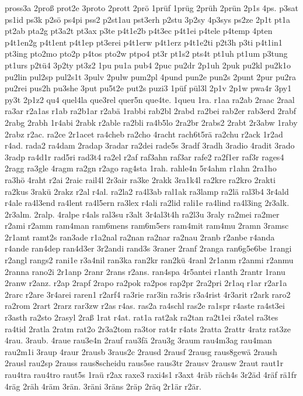{pross3a
2proß
prot2e
3proto
2prott
2prö
1prüf
1prüg
2prüh
2prün
2p1s
4ps.
p3sat
ps1id
ps3k
p2sö
ps4pi
pss2
p2st1au
pst3erh
p2stu
3p2sy
4p3sys
ps2ze
2p1t
pt1a
pt2ab
pta2g
pt3a2t
pt3ax
p3te
p4t1e2b
p4t3ec
p4t1ei
p4tele
p4temp
4pten
p4t1en2g
p4t1ent
p4t1ep
pt3erei
p4t1erw
p4t1erz
p4t1e2ti
p2t3h
p3ti
p4t1in1
pt3ing
pto2mo
pto2p
p4tos
pto2w
ptpo4
pt3r
pt1s2
pts4t
pt1uh
pt1um
p3tung
pt1urs
p2tü4
3p2ty
pt3z2
1pu
pu1a
pub4
2puc
pu2dr
2p1uh
2puk
pu2kl
pu2k1o
pu2lin
pul2sp
pul2s1t
3pulv
2pulw
pum2pl
4pund
pun2e
pun2s
2punt
2pur
pu2ra
pu2rei
pus2h
pu3she
3put
pu5t2e
put2s
puzi3
1püf
pül3l
2p1v
2p1w
pwa4r
3py1
py3t
2p1z2
qu4
quel4la
que3rel
quer5n
que4te.
1queu
1ra.
r1aa
ra2ab
2raac
2raal
ra3ar
r2a1as
r1ab
ra2b1ar
r2abä
1rabbi
rab2bl
2rabd
ra2bei
rab2er
rab3erd
2rabf
2rabg
2rabh
1r4abi
2rabk
r2able
ra2bli
ra4b5lo
2ra2br
2rabs2
2rabt
2r3abw
1raby
2rabz
r2ac.
ra2ce
2r1acet
ra4cheb
ra2cho
4racht
rach6t5rä
ra2chu
r2ack
1r2ad
r4ad.
rada2
ra4dam
2radap
3radar
ra2dei
rade5s
3radf
3radh
3radio
4radit
3rado
3radp
ra4d1r
rad5ri
rad3t4
ra2el
r2af
raf3ahn
raf3ar
rafe2
ra2f1er
raf3r
rages4
2ragg
ra3gle
4ragm
ra2gn
r2ago
rag4sta
1rah.
rahle4n
5r4ahm
r1ahn
2ra1ho
ra3hö
4raht
r2ai
2raic
rail4l
2r3air
ra3ke
2rakk
3ra1k4l
ra2kre
ra2kro
2rakti
ra2kus
3rakü
2rakz
r2al
r4al.
ra2la2
ra4l3ab
ral1ak
ra3lamp
ra2lä
ral3b4
3r4ald
r4ale
ra4l3end
ra4lent
ra4l5ern
ra3lex
r4ali
ra2lid
rali1e
ra4lind
ra4l3ing
2r3alk.
2r3alm.
2ralp.
4ralpe
r4als
ral3su
r3alt
3r4al3t4h
ra2l3u
3raly
ra2mei
ra2mer
r2ami
r2amm
ram4man
ram6mens
ram6m5ers
ram4mit
ram4mu
2ramn
3ramsc
2r1amt
ramt2s
ran3ade
r1a2nal
ra2nan
ra2nar
ra2nau
2ranb
r2anbe
r4anda
r4ande
ran4dep
ran4d3er
3r2andi
rand3s
3raner
2ranf
2ranga
ran6g5e6be
1rangi
r2angl
rangs2
rani1e
r3a4nil
ran3ka
ran2kr
ran2kü
4ranl
2r1anm
r2anmi
r2anmu
2ranna
rano2i
2r1anp
2ranr
2rans
r2ans.
ran4spa
4r5antei
r1anth
2rantr
1ranu
2ranw
r2anz.
r2ap
2rapf
2rapo
ra2pok
ra2pos
rap2pr
2ra2pri
2r1aq
r1ar
r2ar1a
2rarc
r2are
3r4arei
raren1
r2arf4
ra3rie
rar3in
ra3ris
r3a4rist
4r3arit
r2ark
raro2
ra2rom
2rart
2rarz
rar3zw
r2as
r4as.
ras2a
ra4schl
ras2e
ra1spr
r4aste
ra4st3ei
r3asth
ra2sto
2rasyl
2raß
1rat
r4at.
rat1a
rat2ak
ra2tan
ra2t1ei
r3atel
ra3tes
ra4tid
2ratla
2ratm
rat2o
2r3a2tom
ra3tor
rat4r
r4ats
2ratta
2rattr
4ratz
rat3ze
4rau.
3raub.
4raue
rau3e4n
2rauf
rau3fä
2rau3g
3raum
rau4m3ag
rau4man
rau2m1i
3raup
4raur
2rausb
3raus2c
2rausd
2rausf
2rausg
raus8gewä
2raush
2rausl
rau2sp
2rauss
raus8scheidu
raus5se
raus3tr
2rausv
2rausw
2raut
raut1r
rau4tra
rau4tro
raut5s
1raü
r2ax
raxe3
raxi4s1
r3axt
4räb
räch4s
3r2äd
4räf
rä1fr
4räg
2räh
4räm
3rän.
3räni
3räns
2räp
2räq
2r1är
r2är.
}

